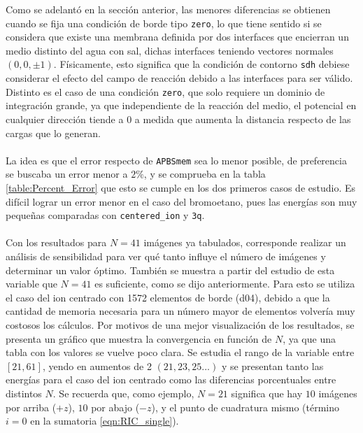 \documentclass[12pt, oneside, numbers, spanish]{ezthesis}
\numberwithin{equation}{section}
\begin{document}
\noindent
Como se adelantó en la sección anterior, las menores diferencias se obtienen cuando se fija una condición de borde tipo \texttt{zero}, lo que tiene sentido si se considera que existe una membrana definida por dos interfaces que encierran un medio distinto del agua con sal, dichas interfaces teniendo vectores normales $(0,0,\pm 1)$. Físicamente, esto significa que la condición de contorno \texttt{sdh} debiese considerar el efecto del campo de reacción debido a las interfaces para ser válido. Distinto es el caso de una condición \texttt{zero}, que solo requiere un dominio de integración grande, ya que independiente de la reacción del medio, el potencial en cualquier dirección tiende a $0$ a medida que aumenta la distancia respecto de las cargas que lo generan.\\\\
La idea es que el error respecto de \texttt{APBSmem} sea lo menor posible, de preferencia se buscaba un error menor a $2\%$, y se comprueba en la tabla \ref{table:Percent_Error} que esto se cumple en los dos primeros casos de estudio. Es difícil lograr un error menor en el caso del bromoetano, pues las energías son muy pequeñas comparadas con \texttt{centered\_ion} y \texttt{3q}.\\\\
Con los resultados para $N=41$ imágenes ya tabulados, corresponde realizar un análisis de sensibilidad para ver qué tanto influye el número de imágenes y determinar un valor óptimo. También se muestra a partir del estudio de esta variable que $N=41$ es suficiente, como se dijo anteriormente. Para esto se utiliza el caso del ion centrado con 1572 elementos de borde (d04), debido a que la cantidad de memoria necesaria para un número mayor de elementos volvería muy costosos los cálculos. Por motivos de una mejor visualización de los resultados, se presenta un gráfico que muestra la convergencia en función de $N$, ya que una tabla con los valores se vuelve poco clara. Se estudia el rango de la variable entre $[21,61]$, yendo en aumentos de 2 $(21, 23, 25...)$ y se presentan tanto las energías para el caso del ion centrado como las diferencias porcentuales entre distintos $N$. Se recuerda que, como ejemplo, $N=21$ significa que hay $10$ imágenes por arriba ($+z$), $10$ por abajo ($-z$), y el punto de cuadratura mismo (término $i = 0$ en la sumatoria \ref{eqn:RIC_single}).
\end{document}
